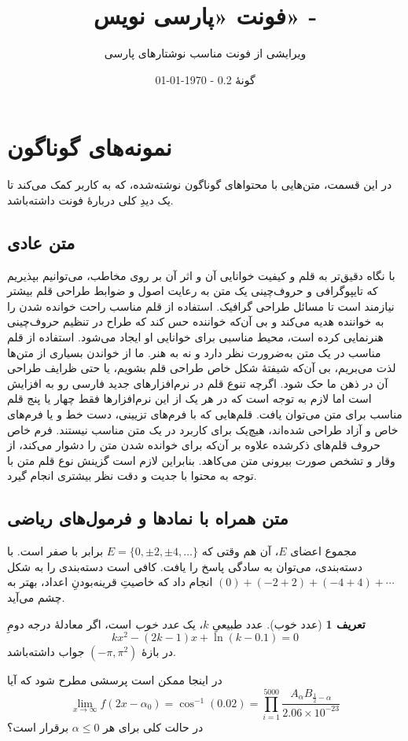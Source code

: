 \documentclass[10pt,a5paper]{article}
\title{\textbf{فونت «پارسی نویس» - \lr{``Parsi Nevis''}}}
\author{ویرایشی از فونت \lr{Scheherazade New} مناسب نوشتارهای پارسی}
\date{%
گونۀ 0.2
\quad - \quad \today \\
\lr{Version 2.0 \quad - \quad \latintoday}
}
\theoremstyle{definition}
\newtheorem{definition}{تعریف}[section]
\theoremstyle{plain}
\begin{document}
\maketitle

\section{نمونه‌های گوناگون}
در این قسمت، متن‌هایی با محتواهای گوناگون نوشته‌شده، که به کاربر کمک می‌کند تا یک دیدِ کلی دربارۀ فونت داشته‌باشد.

\subsection{متن عادی}
با نگاه دقیق‌تر به قلم و کیفیت خوانایی آن و اثر آن بر روی مخاطب، می‌توانیم بپذیریم که تایپوگرافی و حروف‌چینی یک متن به رعایت اصول و ضوابط طراحی قلم بیشتر نیازمند است تا مسائل طراحی گرافیک. استفاده از قلم مناسب راحت خوانده شدن را به خواننده هدیه می‌کند و بی آن‌که خواننده حس کند که طراح در تنظیم حروف‌چینی هنرنمایی کرده است، محیط مناسبی برای خوانایی او ایجاد می‌شود. استفاده از قلم مناسب در یک متن به‌ضرورت نظر دارد و نه به هنر. ما از خواندن بسیاری از متن‌ها لذت می‌بریم، بی آن‌که شیفتهٔ شکل خاص طراحی قلم بشویم، یا حتی ظرایف طراحی آن در ذهن ما حک شود. اگرچه تنوع قلم در نرم‌افزارهای جدید فارسی رو به افزایش است اما لازم به توجه است که در هر یک از این نرم‌افزارها فقط چهار یا پنج قلم مناسب برای متن می‌توان یافت. قلم‌هایی که با فرم‌های تزیینی، دست خط و یا فرم‌های خاص و آزاد طراحی شده‌اند، هیچ‌یک برای کاربرد در یک متن مناسب نیستند. فرم خاص حروف قلم‌های ذکرشده علاوه بر آن‌که برای خوانده شدن متن را دشوار می‌کند، از وقار و تشخص صورت بیرونی متن می‌کاهد. بنابراین لازم است گزینش نوع قلم متن با توجه به محتوا با جدیت و دقت نظر بیشتری انجام گیرد.

\subsection{متن همراه با نمادها و فرمول‌های ریاضی}
مجموع اعضای $E$، آن هم وقتی که $E=\{0,\pm2,\pm4,\ldots\}$ برابر با صفر است. با دسته‌بندی، می‌توان به سادگی پاسخ را یافت. کافی است دسته‌بندی را به شکل $(0)+(-2+2)+(-4+4)+\cdots$ انجام داد که خاصیتِ قرینه‌بودنِ اعداد، بهتر به چشم می‌آید.
\begin{definition}[عدد خوب]
عدد طبیعیِ $k$، یک \emph{عدد خوب }است، اگر معادلۀ درجه دومِ
\[kx^2-(2k-1)x+\ln(k-0.1)=0\]
در بازۀ $(-\pi,\pi^2)$ جواب داشته‌باشد.
\end{definition}
در اینجا ممکن است پرسشی مطرح شود که آیا
\[\lim_{x\to\infty} f(2x-\alpha_0)=\cos^{-1}(0.02)
=\prod_{i=1}^{5000} \frac{A_\alpha B_{\frac{1}{2}-\alpha}}{2.06\times10^{-23}}
\]
در حالت کلی برای هر $\alpha\leq0$ برقرار است؟
\end{document}
